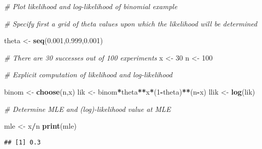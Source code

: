 \documentclass[
]{article}
\newenvironment{Shaded}{\begin{snugshade}}{\end{snugshade}}
\newcommand{\CommentTok}[1]{\textcolor[rgb]{0.56,0.35,0.01}{\textit{#1}}}
\newcommand{\DecValTok}[1]{\textcolor[rgb]{0.00,0.00,0.81}{#1}}
\newcommand{\FloatTok}[1]{\textcolor[rgb]{0.00,0.00,0.81}{#1}}
\newcommand{\KeywordTok}[1]{\textcolor[rgb]{0.13,0.29,0.53}{\textbf{#1}}}
\newcommand{\NormalTok}[1]{#1}
\newcommand{\OperatorTok}[1]{\textcolor[rgb]{0.81,0.36,0.00}{\textbf{#1}}}
\newcommand{\StringTok}[1]{\textcolor[rgb]{0.31,0.60,0.02}{#1}}
\begin{document}
\begin{Shaded}
\begin{Highlighting}[]
\CommentTok{# Plot likelihood and log-likelihood of binomial example}

\CommentTok{# Specify first a grid of theta values upon which the likelihood will be determined}

\NormalTok{theta <-}\StringTok{ }\KeywordTok{seq}\NormalTok{(}\FloatTok{0.001}\NormalTok{,}\FloatTok{0.999}\NormalTok{,}\FloatTok{0.001}\NormalTok{)}

\CommentTok{# There are 30 successes out of 100 experiments}
\NormalTok{x <-}\StringTok{ }\DecValTok{30}
\NormalTok{n <-}\StringTok{ }\DecValTok{100}

\CommentTok{# Explicit computation of likelihood and log-likelihood}

\NormalTok{binom <-}\StringTok{ }\KeywordTok{choose}\NormalTok{(n,x)}
\NormalTok{lik <-}\StringTok{ }\NormalTok{binom}\OperatorTok{*}\NormalTok{theta}\OperatorTok{**}\NormalTok{x}\OperatorTok{*}\NormalTok{(}\DecValTok{1}\OperatorTok{-}\NormalTok{theta)}\OperatorTok{**}\NormalTok{(n}\OperatorTok{-}\NormalTok{x)}
\NormalTok{llik <-}\StringTok{ }\KeywordTok{log}\NormalTok{(lik)}

\CommentTok{# Determine MLE and (log)-likelihood value at MLE}

\NormalTok{mle <-}\StringTok{ }\NormalTok{x}\OperatorTok{/}\NormalTok{n}
\KeywordTok{print}\NormalTok{(mle)}
\end{Highlighting}
\end{Shaded}

\begin{verbatim}
## [1] 0.3
\end{verbatim}
\end{document}
